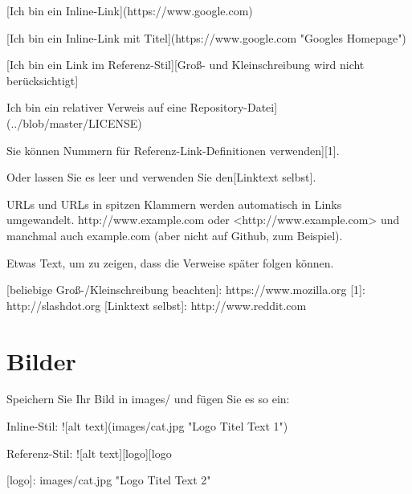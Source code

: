 \documentclass[
  12pt,
  nswissgerman,
  twoside,
  openright]{report}
\newenvironment{Shaded}{\begin{snugshade}}{\end{snugshade}}
\newcommand{\AlertTok}[1]{\textcolor[rgb]{0.94,0.16,0.16}{#1}}
\newcommand{\BaseNTok}[1]{\textcolor[rgb]{0.00,0.00,0.81}{#1}}
\newcommand{\NormalTok}[1]{#1}
\newcommand{\OtherTok}[1]{\textcolor[rgb]{0.56,0.35,0.01}{#1}}
\begin{document}
\begin{Shaded}
\begin{Highlighting}[]
\OtherTok{[Ich bin ein Inline{-}Link](https://www.google.com)}

\OtherTok{[Ich bin ein Inline{-}Link mit Titel](https://www.google.com "Google\textquotesingle{}s Homepage")}

\OtherTok{[Ich bin ein Link im Referenz{-}Stil][Groß{-} und Kleinschreibung wird nicht berücksichtigt]}

\NormalTok{Ich bin ein relativer Verweis auf eine Repository{-}Datei](../blob/master/LICENSE)}

\NormalTok{Sie können Nummern für Referenz{-}Link{-}Definitionen verwenden][1].}

\NormalTok{Oder lassen Sie es leer und verwenden Sie den[Linktext selbst].}

\NormalTok{URLs und URLs in spitzen Klammern werden automatisch in Links umgewandelt.}
\NormalTok{http://www.example.com oder }\OtherTok{<http://www.example.com>}\NormalTok{ und manchmal auch}
\NormalTok{example.com (aber nicht auf Github, zum Beispiel).}

\NormalTok{Etwas Text, um zu zeigen, dass die Verweise später folgen können.}

\OtherTok{[beliebige Groß{-}/Kleinschreibung beachten]: https://www.mozilla.org}
\OtherTok{[1]: http://slashdot.org}
\OtherTok{[Linktext selbst]: http://www.reddit.com}
\end{Highlighting}
\end{Shaded}

\hypertarget{bilder}{%
\section{Bilder}\label{bilder}}

\begin{Shaded}
\begin{Highlighting}[]
\NormalTok{Speichern Sie Ihr Bild in }\BaseNTok{\textasciigrave{}images/\textasciigrave{}}\NormalTok{ und fügen Sie es so ein:}

\NormalTok{Inline{-}Stil:}
\AlertTok{![alt text](images/cat.jpg "Logo Titel Text 1")}

\NormalTok{Referenz{-}Stil:}
\AlertTok{![alt text][logo]}\NormalTok{[logo}

\OtherTok{[logo]: images/cat.jpg "Logo Titel Text 2"}
\end{Highlighting}
\end{Shaded}
\end{document}
